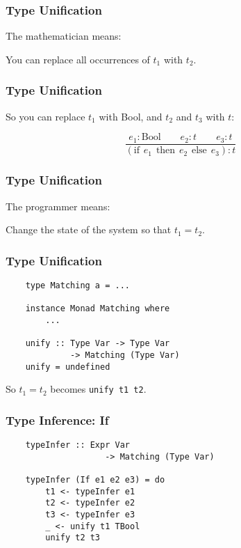 \documentclass{beamer}
\begin{document}
\begin{frame}
\frametitle{Type Unification}
\begin{center}
\Huge{
The mathematician means:

\vspace{40pt}

You can replace all occurrences of $t_1$ with $t_2$.
}
\end{center}
\end{frame}

\begin{frame}
\frametitle{Type Unification}
\Large{
So you can replace $t_1$ with Bool, and $t_2$ and $t_3$ with $t$:

$$\frac{e_1:\text{Bool}\qquad{}e_2:t\qquad{}e_3:t}{
(\text{if}\hspace{5pt}e_1\hspace{5pt}\text{then}\hspace{5pt}e_2
\hspace{5pt}\text{else}\hspace{5pt}e_3):t}$$
}
\end{frame}

\begin{frame}
\frametitle{Type Unification}
\begin{center}
\Huge{
The programmer means:

\vspace{40pt}

Change the state of the system so that $t_1 = t_2$.
}
\end{center}
\end{frame}

\begin{frame}[fragile]
\frametitle{Type Unification}

{\tt\large{
\begin{verbatim}
    type Matching a = ...

    instance Monad Matching where
        ...

    unify :: Type Var -> Type Var
             -> Matching (Type Var)
    unify = undefined
\end{verbatim}

So $t_1 = t_2$ becomes {\tt unify t1 t2}.
}}
\end{frame}

\begin{frame}[fragile]
\frametitle{Type Inference: If }

{\tt\large{
\begin{verbatim}
    typeInfer :: Expr Var
                    -> Matching (Type Var)

    typeInfer (If e1 e2 e3) = do
        t1 <- typeInfer e1
        t2 <- typeInfer e2
        t3 <- typeInfer e3
        _ <- unify t1 TBool
        unify t2 t3
\end{verbatim}
}}
\end{frame}
\end{document}
